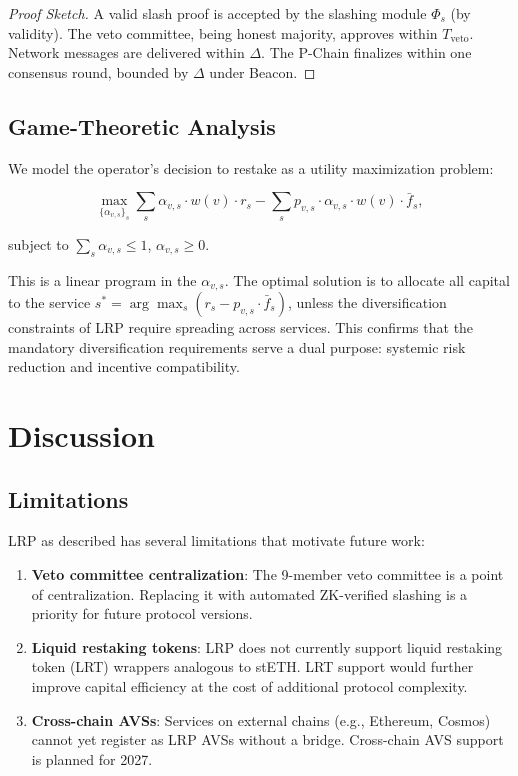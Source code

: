 \documentclass[11pt]{article}
\begin{document}
\begin{proof}[Proof Sketch]
A valid slash proof is accepted by the slashing module $\Phi_s$ (by validity). The veto
committee, being honest majority, approves within $T_{\text{veto}}$. Network messages are
delivered within $\Delta$. The P-Chain finalizes within one consensus round, bounded by
$\Delta$ under Beacon.
\end{proof}

\subsection{Game-Theoretic Analysis}

We model the operator's decision to restake as a utility maximization problem:

\[
  \max_{\{\alpha_{v,s}\}_s} \sum_s \alpha_{v,s} \cdot w(v) \cdot r_s - \sum_s p_{v,s} \cdot \alpha_{v,s} \cdot w(v) \cdot \bar{f}_s,
\]

subject to $\sum_s \alpha_{v,s} \leq 1$, $\alpha_{v,s} \geq 0$.

This is a linear program in the $\alpha_{v,s}$. The optimal solution is to allocate all
capital to the service $s^* = \arg\max_s (r_s - p_{v,s} \cdot \bar{f}_s)$, unless the
diversification constraints of LRP require spreading across services. This confirms that
the mandatory diversification requirements serve a dual purpose: systemic risk reduction
and incentive compatibility.

\section{Discussion}

\subsection{Limitations}

LRP as described has several limitations that motivate future work:

\begin{enumerate}[leftmargin=1.5em]
  \item \textbf{Veto committee centralization}: The 9-member veto committee is a point of
    centralization. Replacing it with automated ZK-verified slashing is a priority for
    future protocol versions.
  \item \textbf{Liquid restaking tokens}: LRP does not currently support liquid restaking
    token (LRT) wrappers analogous to stETH. LRT support would further improve capital
    efficiency at the cost of additional protocol complexity.
  \item \textbf{Cross-chain AVSs}: Services on external chains (e.g., Ethereum, Cosmos)
    cannot yet register as LRP AVSs without a bridge. Cross-chain AVS support is planned
    for 2027.
\end{enumerate}
\end{document}
